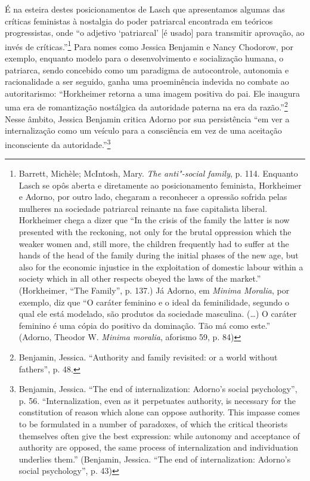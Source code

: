 É na esteira destes posicionamentos de Lasch que apresentamos algumas
das críticas feministas à nostalgia do poder patriarcal encontrada em
teóricos progressistas, onde ``o adjetivo `patriarcal' {[}é usado{]}
para transmitir aprovação, ao invés de críticas.''\footnote{Barrett,
  Michèle; McIntosh, Mary. \emph{The anti"-social family}, p. 114.
  Enquanto Lasch se opôs aberta e diretamente ao posicionamento
  feminista, Horkheimer e Adorno, por outro lado, chegaram a reconhecer
  a opressão sofrida pelas mulheres na sociedade patriarcal reinante na
  fase capitalista liberal. Horkheimer chega a dizer que ``In the crisis
  of the family the latter is now presented with the reckoning, not only
  for the brutal oppression which the weaker women and, still more, the
  children frequently had to suffer at the hands of the head of the
  family during the initial phases of the new age, but also for the
  economic injustice in the exploitation of domestic labour within a
  society which in all other respects obeyed the laws of the market.''
  (Horkheimer, ``The Family'', p. 137.) Já Adorno, em \emph{Minima
  Moralia}, por exemplo, diz que ``O caráter feminino e o ideal da
  feminilidade, segundo o qual ele está modelado, são produtos da
  sociedade masculina. (\ldots{}) O caráter feminino é uma cópia do positivo
  da dominação. Tão má como este.'' (Adorno, Theodor W. \emph{Minima
  moralia}, aforismo 59, p. 84)} Para nomes como Jessica Benjamin e
Nancy Chodorow, por exemplo, enquanto modelo para o desenvolvimento e
socialização humana, o patriarca, sendo concebido como um paradigma de
autocontrole, autonomia e racionalidade a ser seguido, ganha uma
proeminência indevida no combate ao autoritarismo: ``Horkheimer retorna
a uma imagem positiva do pai. Ele inaugura uma era de romantização
nostálgica da autoridade paterna na era da razão.''\footnote{Benjamin,
  Jessica. ``Authority and family revisited: or a world without
  fathers'', p. 48.} Nesse âmbito, Jessica Benjamin critica Adorno por
sua persistência ``em ver a internalização como um veículo para a
consciência em vez de uma aceitação inconsciente da
autoridade.''\footnote{Benjamin, Jessica. ``The end of internalization:
  Adorno's social psychology'', p. 56. ``Internalization, even as it
  perpetuates authority, is necessary for the constitution of reason
  which alone can oppose authority. This impasse comes to be formulated
  in a number of paradoxes, of which the critical theorists themselves
  often give the best expression: while autonomy and acceptance of
  authority are opposed, the same process of internalization and
  individuation underlies them.'' (Benjamin, Jessica. ``The end of
  internalization: Adorno's social psychology'', p. 43)}

